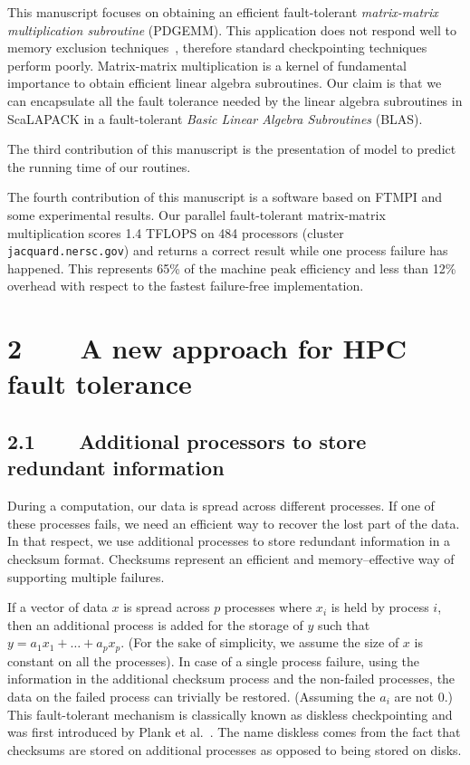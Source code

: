 \documentclass[pdftex,11pt]{article}
\begin{document}
This manuscript focuses on obtaining an efficient fault-tolerant
\textit{matrix-matrix multiplication subroutine} (PDGEMM).  This
application does not respond well to memory exclusion
techniques~\cite{KiPD:97}, therefore standard checkpointing techniques
perform poorly.  Matrix-matrix multiplication is a kernel of
fundamental importance to obtain efficient linear algebra subroutines.
Our claim is that we can encapsulate all the fault tolerance needed by
the linear algebra subroutines in ScaLAPACK in a fault-tolerant
\textit{Basic Linear Algebra Subroutines} (BLAS).

The third contribution of this manuscript is the presentation of model
to predict the running time of our routines.

The fourth contribution of this manuscript is a software based on
FTMPI and some experimental results.  Our parallel fault-tolerant
matrix-matrix multiplication scores 1.4 TFLOPS on 484 processors
(cluster \texttt{jacquard.nersc.gov}) and returns a correct result
while one process failure has happened. This represents 65\% of the
machine peak efficiency and less than 12\% overhead with respect to
the fastest failure-free implementation.

\section*{\color{DodgerBlue4}2~~~~A new approach for HPC fault
  tolerance}

\subsection*{\color{DodgerBlue4}2.1~~~~Additional processors to
  store redundant information}

During a computation, our data is spread across different
processes. If one of these processes fails, we need an efficient way
to recover the lost part of the data. In that respect, we use
additional processes to store redundant information in a checksum
format.  Checksums represent an efficient and memory--effective way of
supporting multiple failures.

If a vector of data $x$ is spread across $p$ processes where $x_i$ is
held by process $i$, then an additional process is added for the
storage of $y$ such that $ y = a_{1}x_1 + \ldots + a_{p} x_p $.  (For
the sake of simplicity, we assume the size of $x$ is constant on all
the processes). In case of a single process failure, using the
information in the additional checksum process and the non-failed
processes, the data on the failed process can trivially be restored.
(Assuming the $a_i$ are not 0.)  This fault-tolerant mechanism is
classically known as diskless checkpointing and was first introduced
by Plank et al.~\cite{PlKD:95}. The name diskless comes from the fact
that checksums are stored on additional processes as opposed to being
stored on disks.
\end{document}
